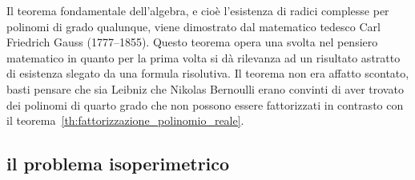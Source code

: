 Il teorema fondamentale dell'algebra, e cioè l'esistenza di radici 
complesse per polinomi di grado qualunque, viene dimostrato dal 
matematico tedesco Carl Friedrich Gauss (1777--1855). 
Questo teorema opera una svolta nel pensiero matematico in quanto 
per la prima volta si dà rilevanza ad un risultato astratto di esistenza 
slegato da una formula risolutiva. 
Il teorema non era affatto scontato, basti pensare che sia Leibniz 
che Nikolas Bernoulli erano convinti di aver trovato dei polinomi 
di quarto grado che non possono essere fattorizzati in contrasto 
con il teorema~\ref{th:fattorizzazione_polinomio_reale}.

\subsection{il problema isoperimetrico}

